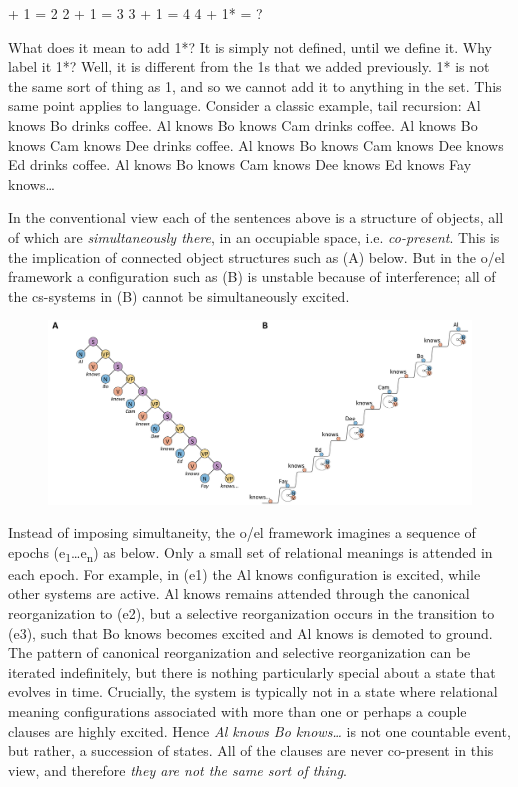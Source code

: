    + 1 = 2    2 + 1 = 3     3 + 1 = 4    4 + 1* = ?
\z

  What does it mean to add 1*? It is simply not defined, until we define it. Why label it 1*? Well, it is different from the 1s that we added previously. 1* is not the same sort of thing as 1, and so we cannot add it to anything in the set. This same point applies to language. Consider a classic example, tail recursion:
\ea
\ea
{Al knows Bo drinks coffee.}
\ex
{Al knows Bo knows Cam drinks coffee.}
\ex
{Al knows Bo knows Cam knows Dee drinks coffee.}
\ex
{Al knows Bo knows Cam knows Dee knows Ed drinks coffee.}
\ex
{Al knows Bo knows Cam knows Dee knows Ed knows Fay knows…}
\z
\z

In the conventional view each of the sentences above is a structure of objects, all of which are \textit{simultaneously there}, in an occupiable space, i.e. \textit{co-present}. This is the implication of connected object structures such as (A) below. But in the o/el framework a configuration such as (B) is unstable because of interference; all of the cs-systems in (B) cannot be simultaneously excited. 

  
\begin{figure}
\includegraphics[width=\textwidth]{figures/Tilsen-img105.png}
\caption{\missingcaption}
\label{fig:5:1}
\end{figure}
 

  Instead of imposing simultaneity, the o/el framework imagines a sequence of epochs (e\textsubscript{1}…e\textsubscript{n}) as below. Only a small set of relational meanings is attended in each epoch. For example, in (e1) the {\textbar}Al knows{\textbar} configuration is excited, while other systems are active. {\textbar}Al knows{\textbar} remains attended through the canonical reorganization to (e2),  but a selective reorganization occurs in the transition to (e3), such that {\textbar}Bo knows{\textbar} becomes excited and {\textbar}Al knows{\textbar} is demoted to ground. The pattern of canonical reorganization and selective reorganization can be iterated indefinitely, but there is nothing particularly special about a state that evolves in time. Crucially, the system is typically not in a state where relational meaning configurations associated with more than one or perhaps a couple clauses are highly excited. Hence \textit{Al knows Bo knows…} is not one countable event, but rather, a succession of states. All of the clauses are never co-present in this view, and therefore \textit{they are not the same sort of thing}.


